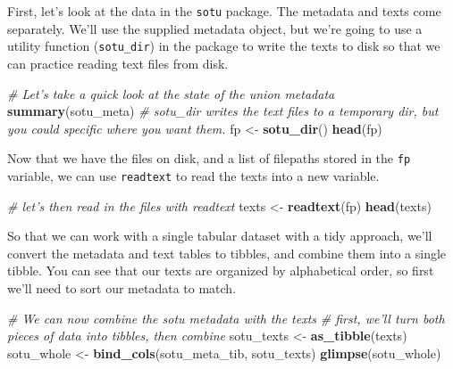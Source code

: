 \documentclass[]{book}
\newenvironment{Shaded}{\begin{snugshade}}{\end{snugshade}}
\newcommand{\CommentTok}[1]{\textcolor[rgb]{0.56,0.35,0.01}{\textit{#1}}}
\newcommand{\KeywordTok}[1]{\textcolor[rgb]{0.13,0.29,0.53}{\textbf{#1}}}
\newcommand{\NormalTok}[1]{#1}
\newcommand{\OperatorTok}[1]{\textcolor[rgb]{0.81,0.36,0.00}{\textbf{#1}}}
\newcommand{\StringTok}[1]{\textcolor[rgb]{0.31,0.60,0.02}{#1}}
\begin{document}
First, let's look at the data in the \texttt{sotu} package. The metadata and texts come separately. We'll use the supplied metadata object, but we're going to use a utility function (\texttt{sotu\_dir}) in the package to write the texts to disk so that we can practice reading text files from disk.

\begin{Shaded}
\begin{Highlighting}[]
\CommentTok{# Let's take a quick look at the state of the union metadata}
\KeywordTok{summary}\NormalTok{(sotu_meta)}
\CommentTok{# sotu_dir writes the text files to a temporary dir, but you could specific where you want them.}
\NormalTok{fp <-}\StringTok{ }\KeywordTok{sotu_dir}\NormalTok{()}
\KeywordTok{head}\NormalTok{(fp)}
\end{Highlighting}
\end{Shaded}

Now that we have the files on disk, and a list of filepaths stored in the \texttt{fp} variable, we can use \texttt{readtext} to read the texts into a new variable.

\begin{Shaded}
\begin{Highlighting}[]
\CommentTok{# let's then read in the files with readtext}
\NormalTok{texts <-}\StringTok{ }\KeywordTok{readtext}\NormalTok{(fp)}
\KeywordTok{head}\NormalTok{(texts)}
\end{Highlighting}
\end{Shaded}

So that we can work with a single tabular dataset with a tidy approach, we'll convert the metadata and text tables to tibbles, and combine them into a single tibble. You can see that our texts are organized by alphabetical order, so first we'll need to sort our metadata to match.

\begin{Shaded}
\end{Shaded}

\begin{Shaded}
\begin{Highlighting}[]
\CommentTok{# We can now combine the sotu metadata with the texts}
\CommentTok{# first, we'll turn both pieces of data into tibbles, then combine}
\NormalTok{sotu_texts <-}\StringTok{ }\KeywordTok{as_tibble}\NormalTok{(texts)}
\NormalTok{sotu_whole <-}\StringTok{ }\KeywordTok{bind_cols}\NormalTok{(sotu_meta_tib, sotu_texts)}
\KeywordTok{glimpse}\NormalTok{(sotu_whole)}
\end{Highlighting}
\end{Shaded}
\end{document}
